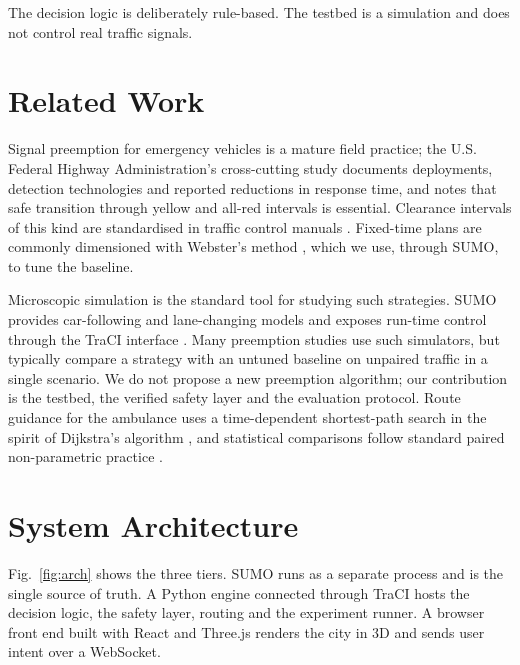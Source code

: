 \documentclass[conference]{IEEEtran}
\begin{document}
The decision logic is deliberately rule-based. The testbed is a simulation and does not control real traffic signals.

\section{Related Work}

Signal preemption for emergency vehicles is a mature field practice; the U.S. Federal Highway Administration's cross-cutting study \cite{fhwa_evp} documents deployments, detection technologies and reported reductions in response time, and notes that safe transition through yellow and all-red intervals is essential. Clearance intervals of this kind are standardised in traffic control manuals \cite{mutcd}. Fixed-time plans are commonly dimensioned with Webster's method \cite{webster}, which we use, through SUMO, to tune the baseline.

Microscopic simulation is the standard tool for studying such strategies. SUMO \cite{sumo} provides car-following \cite{krauss} and lane-changing \cite{erdmann} models and exposes run-time control through the TraCI interface \cite{traci}. Many preemption studies use such simulators, but typically compare a strategy with an untuned baseline on unpaired traffic in a single scenario. We do not propose a new preemption algorithm; our contribution is the testbed, the verified safety layer and the evaluation protocol. Route guidance for the ambulance uses a time-dependent shortest-path search in the spirit of Dijkstra's algorithm \cite{dijkstra}, and statistical comparisons follow standard paired non-parametric practice \cite{wilcoxon,efron,efron_book}.

\section{System Architecture}

Fig.~\ref{fig:arch} shows the three tiers. SUMO runs as a separate process and is the single source of truth. A Python engine connected through TraCI hosts the decision logic, the safety layer, routing and the experiment runner. A browser front end built with React and Three.js renders the city in 3D and sends user intent over a WebSocket.
\end{document}
